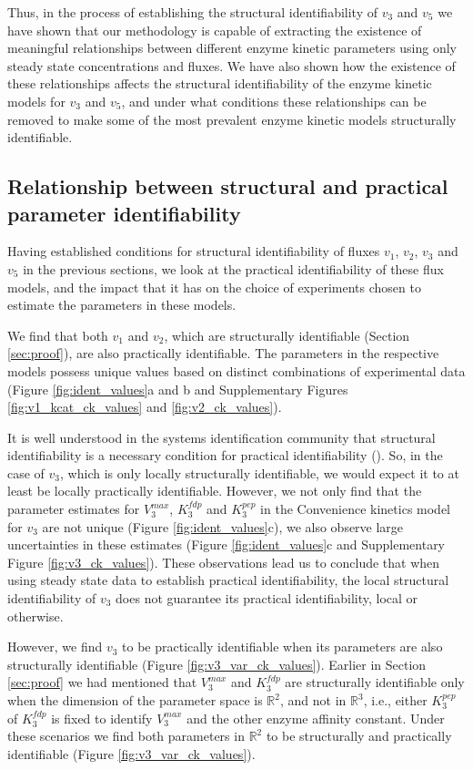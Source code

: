 \documentclass[10pt]{article}
\begin{document}
	Thus, in the process of establishing the structural identifiability of $v_3$ and $v_5$ we have shown that our methodology is capable of extracting the existence of meaningful relationships between different enzyme kinetic parameters using only steady state concentrations and fluxes. We have also shown how the existence of these relationships affects the structural identifiability of the enzyme kinetic models for $v_3$ and $v_5$, and under what conditions these relationships can be removed to make some of the most prevalent enzyme kinetic models structurally identifiable. 	
	
	\subsection{Relationship between structural and practical parameter identifiability}\label{sec:initial_analysis}
	Having established conditions for structural identifiability of fluxes $v_1$, $v_2$, $v_3$ and $v_5$ in the previous sections, we look at the practical identifiability of these flux models, and the impact that it has on the choice of experiments chosen to estimate the parameters in these models.	
	
	We find that both $v_1$ and $v_2$, which are structurally identifiable (Section \ref{sec:proof}), are also practically identifiable. The parameters in the respective models possess unique values based on distinct combinations of experimental data (Figure \ref{fig:ident_values}a and b and Supplementary Figures \ref{fig:v1_kcat_ck_values} and \ref{fig:v2_ck_values}). 
	
	It is well understood in the systems identification community that structural identifiability is a necessary condition for practical identifiability (). So, in the case of $v_3$, which is only locally structurally identifiable, we would expect it to at least be locally practically identifiable. However, we not only find that the parameter estimates for $V_3^{max}$, $K_3^{fdp}$ and $K_3^{pep}$ in the Convenience kinetics model for $v_3$ are not unique (Figure \ref{fig:ident_values}c), we also observe large uncertainties in these estimates (Figure \ref{fig:ident_values}c and Supplementary Figure \ref{fig:v3_ck_values}).  These observations lead us to conclude that when using steady state data to establish practical identifiability, the local structural identifiability of $v_3$ does not guarantee its practical identifiability, local or otherwise. 
	
	However, we find $v_3$ to be practically identifiable when its parameters are also structurally identifiable (Figure \ref{fig:v3_var_ck_values}). Earlier in Section \ref{sec:proof} we had mentioned that $V_3^{max}$ and $K_3^{fdp}$ are structurally identifiable only when the dimension of the parameter space is $\mathbb{R}^2$, and not in $\mathbb{R}^3$, i.e., either $K_3^{pep}$ of $K_3^{fdp}$ is fixed to identify $V_3^{max}$ and the other enzyme affinity constant. Under these scenarios we find both parameters in $\mathbb{R}^2$ to be structurally and practically identifiable (Figure \ref{fig:v3_var_ck_values}).	
	
\end{document}
